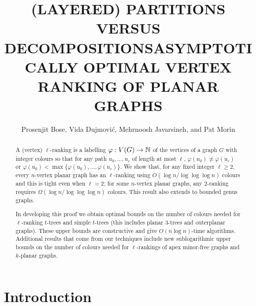 \documentclass[kpfonts]{patmorin}
\title{\MakeUppercase{(Layered) Partitions versus Decompositions}}
\author{}
\title{\MakeUppercase{Asymptotically Optimal Vertex Ranking of Planar Graphs}}
\author{Prosenjit Bose, Vida Dujmović, Mehrnoosh Javarsineh, and Pat Morin}
\theoremstyle{named}
\begin{document}
\begin{titlepage}
\maketitle

\begin{abstract}
  A (vertex) $\ell$-ranking is a labelling $\varphi:V(G)\to\mathbb{N}$ of the vertices of a graph $G$ with integer colours so that for any path $u_0,\ldots,u_r$ of length at most $\ell$, $\varphi(u_0)\neq\varphi(u_r)$ or $\varphi(u_0)<\max\{\varphi(u_0),\ldots,\varphi(u_r)\}$.  We show that, for any fixed integer $\ell\ge 2$, every $n$-vertex planar graph has an $\ell$-ranking using $O(\log n/\log\log\log n)$ colours and this is tight even when $\ell=2$; for some $n$-vertex planar graphs, any 2-ranking requires $\Omega(\log n/\log\log\log n)$ colours.  This result also extends to bounded genus graphs.

  In developing this proof we obtain optimal bounds on the number of colours needed for $\ell$-ranking $t$-trees and simple $t$-trees (this includes planar 3-trees and outerplanar graphs).  These upper bounds are constructive and give $O(n\log n)$-time algorithms.  Additional results that come from our techniques include new sublogarithmic upper bounds on the number of colours needed for $\ell$-rankings of apex minor-free graphs and $k$-planar graphs.
\end{abstract}
\end{titlepage}

\tableofcontents

\newpage
{}

\section{Introduction}

\end{document}
